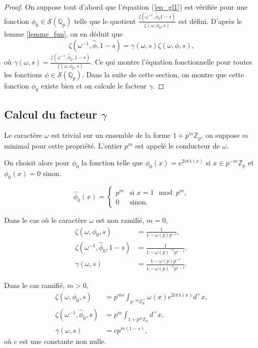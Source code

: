 \begin{proof}
On suppose tout d'abord que l'équation (\ref{eq_gl1}) est vérifiée pour une fonction $\phi_0 \in \mathcal{S}(\mathbb{Q}_p)$ telle que le quotient $\frac{\zeta(\omega^{-1}, \hat{\phi}_0 1-s)}{\zeta(\omega, \phi_0, s)}$ est défini. D'après le lemme \ref{lemme_fun}, on en déduit que
\begin{equation}
\zeta(\omega^{-1}, \hat{\phi}, 1-s) = \gamma(\omega,s)\zeta(\omega, \phi, s),
\end{equation}
où $\gamma(\omega,s) = \frac{\zeta(\omega^{-1}, \hat{\phi}_0, 1-s)}{\zeta(\omega, \phi_0, s)}$. Ce qui montre l'équation fonctionnelle pour toutes les fonctions $\phi \in \mathcal{S}(\mathbb{Q}_p)$. Dans la suite de cette section, on montre que cette fonction $\phi_0$ existe bien et on calcule le facteur $\gamma$.
\end{proof}

\subsection{Calcul du facteur $\gamma$}

Le caractère $\omega$ est trivial sur un ensemble de la forme $1+p^m \mathbb{Z}_p$, on suppose $m$ minimal pour cette propriété. L'entier $p^m$ est appelé le conducteur de $\omega$.

On choisit alors pour $\phi_0$ la fonction telle que $\phi_0(x)=e^{2i\pi \lambda(x)}$ si $x \in p^{-m}\mathbb{Z}_p$ et $\phi_0(x)=0$ sinon.

\begin{lemme}
\begin{equation}
\hat{\phi}_0(x) = \left\{
    \begin{array}{ll}
        p^m & \mbox{si } x = 1 \mod p^m, \\
        0 & \mbox{sinon.}
    \end{array}
\right.
\end{equation}
\end{lemme}

Dans le cas où le caractère $\omega$ est non ramifié, $m=0$,
\begin{align}
\zeta(\omega, \phi_0, s)&=\frac{1}{1-\omega(p)p^{-s}},\\
\zeta(\omega^{-1}, \hat{\phi}_0, 1-s) &= \frac{1}{1-\omega(p)^{-1}p^{s-1}}, \\
\gamma(\omega,s) &= \frac{1-\omega(p)p^{-s}}{1-\omega(p)^{-1}p^{s-1}}.
\end{align}

Dans le cas ramifié, $m > 0$,
\begin{align}
\zeta(\omega, \phi_0, s) &= p^{ms}\int_{p^{-m}\mathbb{Z}_p^\times} \omega(x)e^{2i\pi \lambda(x)}d^\times x, \\
\zeta(\omega^{-1}, \hat{\phi}_0, s) &= p^m\int_{1+p^{m}\mathbb{Z}_p} d^\times x, \\
\gamma(\omega,s) &= c p^{m(1-s)},
\end{align}
où $c$ est une constante non nulle.

